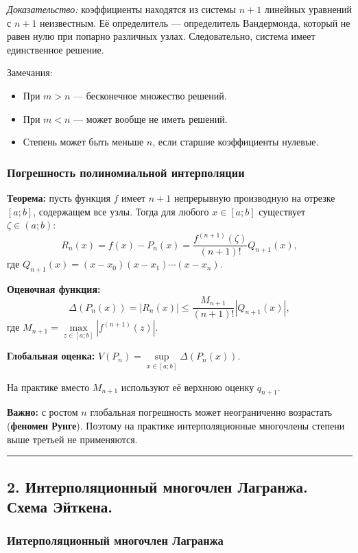 \documentclass[14pt,a4paper]{extarticle}
\begin{document}
\textit{Доказательство:} коэффициенты находятся из системы $n+1$ линейных уравнений с $n+1$ неизвестным. Её определитель --- определитель Вандермонда, который не равен нулю при попарно различных узлах. Следовательно, система имеет единственное решение.

Замечания:
\begin{itemize}
    \item При $m > n$ --- бесконечное множество решений.
    \item При $m < n$ --- может вообще не иметь решений.
    \item Степень может быть меньше $n$, если старшие коэффициенты нулевые.
\end{itemize}

\subsubsection{Погрешность полиномиальной интерполяции}

\textbf{Теорема:} пусть функция $f$ имеет $n+1$ непрерывную производную на отрезке $[a; b]$, содержащем все узлы. Тогда для любого $x \in [a; b]$ существует $\zeta \in (a; b)$:
\[R_n(x) = f(x) - P_n(x) = \frac{f^{(n+1)}(\zeta)}{(n+1)!} Q_{n+1}(x),\]
где $Q_{n+1}(x) = (x - x_0)(x - x_1)\cdots(x - x_n)$.

\textbf{Оценочная функция:}
\[\Delta(P_n(x)) = |R_n(x)| \leq \frac{M_{n+1}}{(n+1)!} |Q_{n+1}(x)|,\]
где $M_{n+1} = \max\limits_{z \in [a; b]} |f^{(n+1)}(z)|$.

\textbf{Глобальная оценка:} $V(P_n) = \sup\limits_{x \in [a; b]} \Delta(P_n(x))$.

На практике вместо $M_{n+1}$ используют её верхнюю оценку $q_{n+1}$.

\textbf{Важно:} с ростом $n$ глобальная погрешность может неограниченно возрастать (\textbf{феномен Рунге}). Поэтому на практике интерполяционные многочлены степени выше третьей не применяются.

\hrule\bigskip

\subsection{2. Интерполяционный многочлен Лагранжа. Схема Эйткена.}

\subsubsection{Интерполяционный многочлен Лагранжа}
\end{document}
